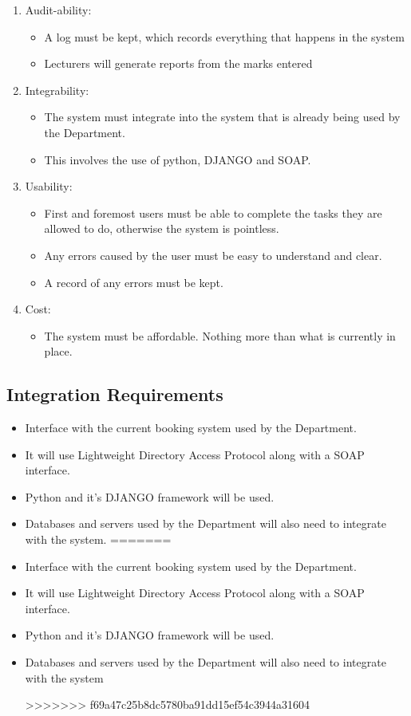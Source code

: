 \begin{enumerate}
\begin{itemize}
\end{itemize}
\item Audit-ability:
\begin{itemize}
\item A log must be kept, which records everything that happens in the system
\item Lecturers will generate reports from the marks entered
\end{itemize}
\item Integrability:
\begin{itemize}
\item The system must integrate into the system that is already being used by the Department.
\item This involves the use of python, DJANGO and SOAP.
\end{itemize}
\item Usability:
\begin{itemize}
\item First and foremost users must be able to complete the tasks they are allowed to do, otherwise the system is pointless.
\item Any errors caused by the user must be easy to understand and clear.
\item A record of any errors must be kept.
\end{itemize}
\item Cost:
\begin{itemize}
\item The system must be affordable. Nothing more than what is currently in place.
\end{itemize}
\end{enumerate}

\subsection{Integration Requirements}

\begin{itemize}
<<<<<<< HEAD
\item Interface with the current booking system used by the Department.
\item It will use Lightweight Directory Access Protocol along with a SOAP interface.
\item Python and it's DJANGO framework will be used.
\item Databases and servers used by the Department will also need to integrate with the system.
=======

\item Interface with the current booking system used by the Department.
\item It will use Lightweight Directory Access Protocol along with a SOAP interface.
\item Python and it's DJANGO framework will be used.
\item Databases and servers used by the Department will also need to integrate with the system 

>>>>>>> f69a47c25b8dc5780ba91dd15ef54c3944a31604
\end{itemize}
